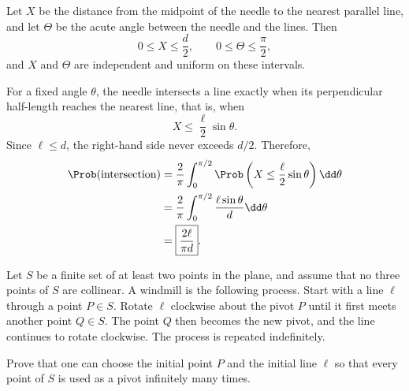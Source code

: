     \begin{solution}
        Let $X$ be the distance from the midpoint of the needle to the nearest
        parallel line, and let $\Theta$ be the acute angle between the needle
        and the lines. Then
        \[
            0\leq X\leq\frac{d}{2},
            \qquad
            0\leq\Theta\leq\frac{\pi}{2},
        \]
        and $X$ and $\Theta$ are independent and uniform on these intervals.

        For a fixed angle $\theta$, the needle intersects a line exactly when
        its perpendicular half-length reaches the nearest line, that is, when
        \[
            X\leq\frac{\ell}{2}\sin\theta.
        \]
        Since $\ell\leq d$, the right-hand side never exceeds $d/2$.
        Therefore,
        \[
            \begin{aligned}
                \Prob(\text{intersection})
                &=
                \frac{2}{\pi}
                \int_0^{\pi/2}
                \Prob\left(
                    X\leq\frac{\ell}{2}\sin\theta
                \right)\dd\theta\\
                &=
                \frac{2}{\pi}
                \int_0^{\pi/2}
                \frac{\ell\sin\theta}{d}\dd\theta\\
                &=
                \boxed{\frac{2\ell}{\pi d}}.
            \end{aligned}
        \]
    \end{solution}

    \begin{expectedproblem}
        Let $S$ be a finite set of at least two points in the plane, and assume
        that no three points of $S$ are collinear. A windmill is the following
        process. Start with a line $\ell$ through a point $P\in S$. Rotate
        $\ell$ clockwise about the pivot $P$ until it first meets another point
        $Q\in S$. The point $Q$ then becomes the new pivot, and the line
        continues to rotate clockwise. The process is repeated indefinitely.

        Prove that one can choose the initial point $P$ and the initial line
        $\ell$ so that every point of $S$ is used as a pivot infinitely many
        times.
    \end{expectedproblem}

